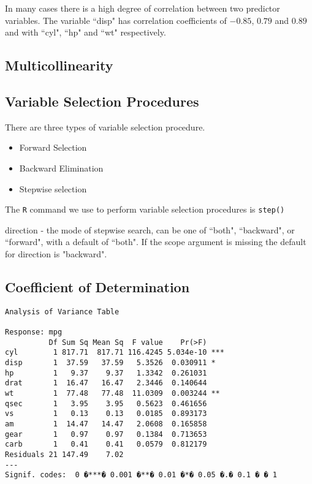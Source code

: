 \documentclass[12pt, a4paper]{report}
\theoremstyle{plain}
\theoremstyle{definition}
\theoremstyle{remark}
\begin{document}
In many cases there is a high degree of correlation between two predictor variables. The variable ``disp" has correlation coefficients of $-0.85$, $0.79$ and $0.89$ and with ``cyl", ``hp" and ``wt" respectively.

\subsection{Multicollinearity}


\subsection{Variable Selection Procedures}

There are three types of variable selection procedure.
\begin{itemize}
\item Forward Selection
\item Backward Elimination
\item Stepwise selection
\end{itemize}


The \texttt{R} command we use to perform variable selection procedures is \texttt{step()}

direction  - the mode of stepwise search, can be one of ``both", ``backward", or ``forward", with a default of ``both". If the scope argument is missing the default for direction is "backward".

\subsection{Coefficient of Determination}


\begin{verbatim}
Analysis of Variance Table

Response: mpg
          Df Sum Sq Mean Sq  F value    Pr(>F)
cyl        1 817.71  817.71 116.4245 5.034e-10 ***
disp       1  37.59   37.59   5.3526  0.030911 *
hp         1   9.37    9.37   1.3342  0.261031
drat       1  16.47   16.47   2.3446  0.140644
wt         1  77.48   77.48  11.0309  0.003244 **
qsec       1   3.95    3.95   0.5623  0.461656
vs         1   0.13    0.13   0.0185  0.893173
am         1  14.47   14.47   2.0608  0.165858
gear       1   0.97    0.97   0.1384  0.713653
carb       1   0.41    0.41   0.0579  0.812179
Residuals 21 147.49    7.02
---
Signif. codes:  0 �***� 0.001 �**� 0.01 �*� 0.05 �.� 0.1 � � 1
\end{verbatim}
\end{document}
